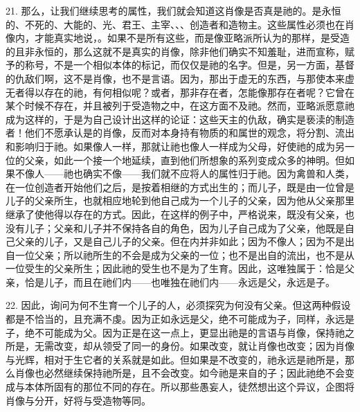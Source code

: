 21. 那么，让我们继续思考的属性，我们就会知道这肖像是否真是祂的。是永恒的、不死的、大能的、光、君王、主宰、、、创造者和造物主。这些属性必须也在肖像内，才能真实地说，。如果不是所有这些，而是像亚略派所认为的那样，是受造的且非永恒的，那么这就不是真实的肖像，除非他们确实不知羞耻，进而宣称，赋予的称号，不是一个相似本体的标记，而仅仅是祂的名字。但是，另一方面，基督的仇敌们啊，这不是肖像，也不是言语。因为，那出于虚无的东西，与那使本来虚无者得以存在的祂，有何相似呢？或者，那非存在者，怎能像那存在者呢？它曾在某个时候不存在，并且被列于受造物之中，在这方面不及祂。然而，亚略派愿意祂成为这样的，于是为自己设计出这样的论证：这些天主的仇敌，确实是亵渎的制造者！他们不愿承认是的肖像，反而对本身持有物质的和属世的观念，将分割、流出和影响归于祂。如果像人一样，那就让祂也像人一样成为父母，好使祂的成为另一位的父亲，如此一个接一个地延续，直到他们所想象的系列变成众多的神明。但如果不像人——祂也确实不像——我们就不应将人的属性归于祂。因为禽兽和人类，在一位创造者开始他们之后，是按着相继的方式出生的；而儿子，既是由一位曾是儿子的父亲所生，也就相应地轮到他自己成为一个儿子的父亲，因为他从父亲那里继承了使他得以存在的方式。因此，在这样的例子中，严格说来，既没有父亲，也没有儿子；父亲和儿子并不保持各自的角色，因为儿子自己成为了父亲，他既是自己父亲的儿子，又是自己儿子的父亲。但在内并非如此；因为不像人；因为不是出自一位父亲；所以祂所生的不会是成为父亲的一位；也不是出自的流出，也不是从一位受生的父亲所生；因此祂的受生也不是为了生育。因此，这唯独属于：恰是父亲，恰是儿子，而且在祂们内——也唯独在祂们内——永远是父，永远是子。\par

22. 因此，询问为何不生育一个儿子的人，必须探究为何没有父亲。但这两种假设都是不恰当的，且充满不虔。因为正如永远是父，绝不可能成为子，同样，永远是子，绝不可能成为父。因为正是在这一点上，更显出祂是的言语与肖像，保持祂之所是，无需改变，却从领受了同一的身份。如果改变，就让肖像也改变；因为肖像与光辉，相对于生它者的关系就是如此。但如果是不改变的，祂永远是祂所是，那么肖像也必然继续保持祂所是，且不会改变。如今祂是来自的子；因此祂绝不会变成与本体所固有的那位不同的存在。所以那些愚妄人，徒然想出这个异议，企图将肖像与分开，好将与受造物等同。\par

